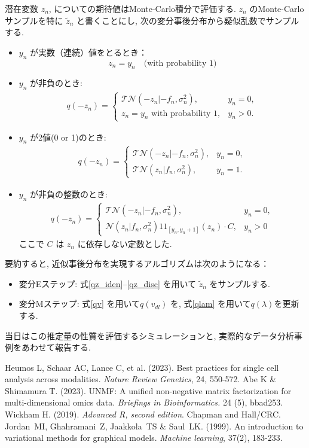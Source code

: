 \documentclass[a4paper,12ptc]{jsarticle} %
\newcommand{\one}{1\!\!1}
\begin{document}
潜在変数 $z_n$, についての期待値はMonte-Carlo積分で評価する. $z_n$ のMonte-Carloサンプルを特に $\tilde z_n$ と書くことにし, 次の変分事後分布から疑似乱数でサンプルする. 
\begin{itemize}
\item $y_n$ が実数（連続）値をとるとき： 
\begin{equation}
z_n=y_n \quad \mbox{(with probability 1)}  \label{qz_iden}
\end{equation}
\item $y_n$ が非負のとき:
\begin{align}
q(-z_n) = \begin{cases}
    \mathcal{TN}(-z_n|-f_n, \sigma_n^2), & y_n=0,\\
    z_n = y_n \mbox{~with probability 1}, & y_n>0.
\end{cases} \label{qz_rect}
\end{align}
\item $y_n$ が2値(0 or 1)のとき:
\begin{align}
q(-z_n) = \begin{cases}
    \mathcal{TN}(-z_n|-f_n, \sigma_n^2), & y_n=0,\\
    \mathcal{TN}(z_n|f_n, \sigma_n^2), & y_n=1.
\end{cases}\label{qz_binary}
\end{align}
\item $y_n$ が非負の整数のとき:
\begin{align}
q(-z_n) = \begin{cases}
    \mathcal{TN}(-z_n|-f_n, \sigma_n^2), & y_n=0,\\
    \mathcal{N}(z_n|f_n, \sigma_n^2) \one_{[y_n,y_n+1]}(z_n) \cdot C, & y_n > 0
\end{cases}\label{qz_disc}
\end{align}
ここで $C$ は $z_n$ に依存しない定数とした.
\end{itemize}

要約すると, 近似事後分布を実現するアルゴリズムは次のようになる：
\begin{itemize}
\item 変分Eステップ: 式\ref{qz_iden}--\ref{qz_disc} を用いて $\tilde{z}_n$ をサンプルする.
\item 変分Mステップ:  式\ref{qv} を用いて$q(v_{dl})$ を, 式\ref{qlam} を用いて$q(\lambda)$を更新する. 
\end{itemize}

当日はこの推定量の性質を評価するシミュレーションと, 実際的なデータ分析事例をあわせて報告する.

\begin{thebibliography}{9}
 Heumos L, Schaar AC, Lance C, et al. (2023). Best practices for single cell analysis across modalities. {\em Nature Review Genetics}, 24, 550-572.
 Abe K \& Shimamura T. (2023). UNMF: A unified non-negative matrix factorization for multi-dimensional omics data. {\em Briefings in Bioinformatics.}  24 (5), bbad253.
 Wickham H. (2019).  {\em Advanced R, second edition}. Chapman and Hall/CRC.
 Jordan~MI, Ghahramani~Z, Jaakkola~TS \& Saul~LK. (1999). An introduction to variational methods for graphical models. {\em Machine learning}, 37(2), 183-233.
\end{thebibliography}
\end{document}
